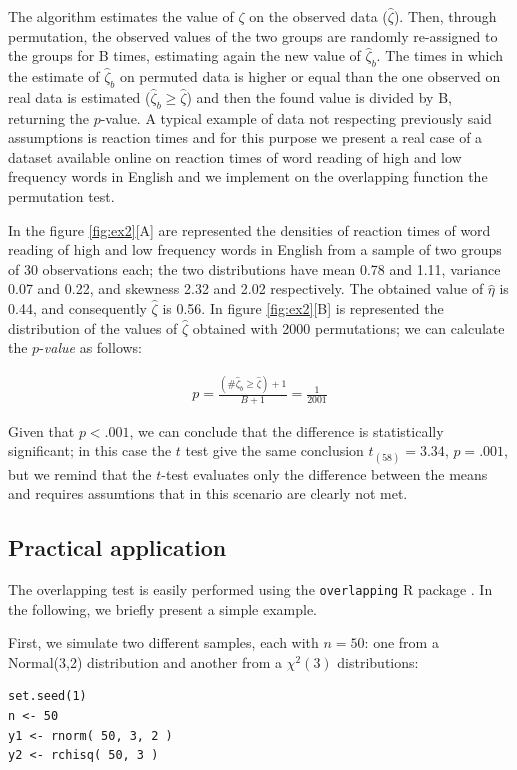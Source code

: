 \documentclass[twocolumn]{article}\usepackage[]{graphicx}\usepackage[]{xcolor}
\makeatletter
\newenvironment{kframe}{%
 \def\at@end@of@kframe{}%
 \ifinner\ifhmode%
  \def\at@end@of@kframe{\end{minipage}}%
  \begin{minipage}{\columnwidth}%
 \fi\fi%
 \def\FrameCommand##1{\hskip\@totalleftmargin \hskip-\fboxsep
 \colorbox{shadecolor}{##1}\hskip-\fboxsep
     \hskip-\linewidth \hskip-\@totalleftmargin \hskip\columnwidth}%
 \MakeFramed {\advance\hsize-\width
   \@totalleftmargin\z@ \linewidth\hsize
   \@setminipage}}%
 {\par\unskip\endMakeFramed%
 \at@end@of@kframe}
\newenvironment{knitrout}{}{} %
\makeatother
\begin{document}
The algorithm estimates the value of $\zeta$ on the observed data ($\hat{\zeta}$). Then, through permutation, the observed values of the two groups are randomly re-assigned to the groups for B times, estimating again the new value of  $\hat{\zeta}_b$. The times in which the estimate of $\hat{\zeta}_b$ on permuted data is higher or equal than the one observed on real data is estimated ($\hat{\zeta}_b \geq \hat{\zeta}$) and then the found value is divided by B, returning the $p$-value. 
A typical example of data not respecting previously said assumptions is reaction times and for this purpose we present a real case of a dataset available online \cite{Oksuz_Rebuschat_2024} on reaction times of word reading of high and low frequency words in English and we implement on the overlapping function the permutation test. 

In the figure \ref{fig:ex2}[A] are represented the densities of reaction times of word reading of high and low frequency words in English from a sample of two groups of 30 observations each; the two distributions have mean 0.78 and 1.11, variance 0.07 and 0.22, and skewness 2.32 and 2.02 respectively. The obtained value of $\hat{\eta}$ is 0.44, and consequently $\hat{\zeta}$ is 0.56. In figure \ref{fig:ex2}[B] is represented the distribution of the values of $\hat{\zeta}$ obtained with 2000 permutations; we can calculate the $p$-\emph{value} as follows:

\begin{eqnarray*}
p = \frac{(\# \hat{\zeta}_b \geq \hat{\zeta})+1 }{B+1} = \frac{1}{ 2001 } %
\end{eqnarray*}

Given that $p < .001$, we can conclude that the difference is statistically significant; in this case the $t$ test give the same conclusion $t_{(58)} = 3.34$, $p = .001$, but we remind that the $t$-test evaluates only the difference between the means and requires assumtions that in this scenario are clearly not met.

\subsection{Practical application}

The overlapping test is easily performed using the \texttt{overlapping} R package  \cite{overlapping:package}. In the following, we briefly present a simple example.  




First, we simulate two different samples, each with $n = 50$: one from a Normal(3,2) distribution and another from a $\chi^2(3)$ distributions:
\begin{knitrout}
\color{fgcolor}\begin{kframe}
\begin{verbatim}
set.seed(1) 
n <- 50 
y1 <- rnorm( 50, 3, 2 ) 
y2 <- rchisq( 50, 3 ) 
\end{verbatim}
\end{kframe}
\end{knitrout}
\end{document}

